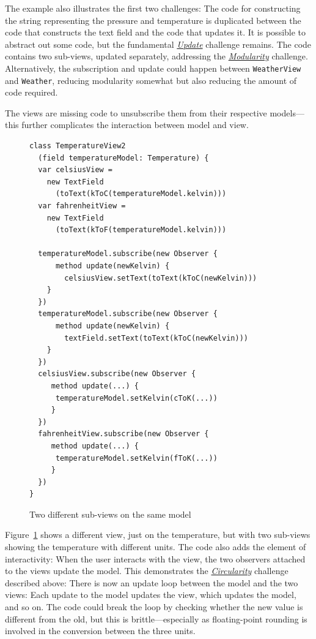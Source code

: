 \documentclass[sigplan,review,screen]{acmart}
\begin{document}
The example also illustrates the first two challenges:
The code for constructing the string representing the pressure
and temperature is duplicated between the code that constructs the
text field and the code that updates it.  It is possible to abstract
out some code, but the fundamental
\hyperlink{challenge:update}{\textit{Update}} challenge remains.
The code contains two sub-views, updated separately, addressing the
\hyperlink{challenge:modularity}{\textit{Modularity}} challenge.
Alternatively, the subscription and update could happen between
\texttt{WeatherView} and \texttt{Weather}, reducing modularity
somewhat but also reducing the amount of code required.

The views are missing code to unsubscribe them from their
respective models---this further complicates the interaction between
model and view.

\begin{figure}[tb]
\begin{verbatim}
class TemperatureView2
  (field temperatureModel: Temperature) {
  var celsiusView =
    new TextField
      (toText(kToC(temperatureModel.kelvin)))
  var fahrenheitView =
    new TextField
      (toText(kToF(temperatureModel.kelvin)))

  temperatureModel.subscribe(new Observer {
      method update(newKelvin) {
        celsiusView.setText(toText(kToC(newKelvin)))
    }
  })
  temperatureModel.subscribe(new Observer {
      method update(newKelvin) {
        textField.setText(toText(kToC(newKelvin)))
    }
  })
  celsiusView.subscribe(new Observer {
     method update(...) {
      temperatureModel.setKelvin(cToK(...))
     }
  })
  fahrenheitView.subscribe(new Observer {
     method update(...) {
      temperatureModel.setKelvin(fToK(...))
     }
  })
}
\end{verbatim}
  \vspace*{-2ex}
  \caption{Two different sub-views on the same model}
  \label{fig:temperature-view2}
\end{figure}
%
Figure~\ref{fig:temperature-view2} shows a different view, just on the
temperature, but with two sub-views showing the temperature with
different units.  The code also adds the element of interactivity:
When the user interacts with the view, the two observers attached to
the views update the model.  This demonstrates the
\hyperlink{challenge:circularity}{\textit{Circularity}} challenge
described above: There is now an update loop between the model and
the two views: Each update to the model updates the view, which
updates the model, and so on.  The code could break the loop by
checking whether the new value is different from the old, but this is brittle---especially as
floating-point rounding is involved in the conversion between the
three units.
\end{document}
